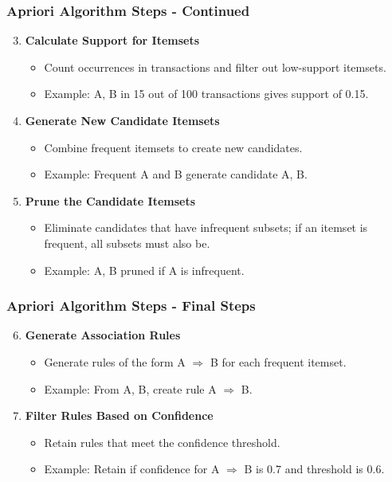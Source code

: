 \documentclass[aspectratio=169]{beamer}
\begin{document}
\begin{frame}[fragile]
    \frametitle{Apriori Algorithm Steps - Continued}
    \begin{enumerate}
        \setcounter{enumi}{2}
        \item \textbf{Calculate Support for Itemsets}
        \begin{itemize}
            \item Count occurrences in transactions and filter out low-support itemsets.
            \item Example: {A, B} in 15 out of 100 transactions gives support of 0.15.
        \end{itemize}

        \item \textbf{Generate New Candidate Itemsets}
        \begin{itemize}
            \item Combine frequent itemsets to create new candidates.
            \item Example: Frequent {A} and {B} generate candidate {A, B}.
        \end{itemize}

        \item \textbf{Prune the Candidate Itemsets}
        \begin{itemize}
            \item Eliminate candidates that have infrequent subsets; if an itemset is frequent, all subsets must also be.
            \item Example: {A, B} pruned if {A} is infrequent.
        \end{itemize}
    \end{enumerate}
\end{frame}

\begin{frame}[fragile]
    \frametitle{Apriori Algorithm Steps - Final Steps}
    \begin{enumerate}
        \setcounter{enumi}{5}
        \item \textbf{Generate Association Rules}
        \begin{itemize}
            \item Generate rules of the form A $\Rightarrow$ B for each frequent itemset.
            \item Example: From {A, B}, create rule {A} $\Rightarrow$ {B}.
        \end{itemize}

        \item \textbf{Filter Rules Based on Confidence}
        \begin{itemize}
            \item Retain rules that meet the confidence threshold.
            \item Example: Retain if confidence for {A} $\Rightarrow$ {B} is 0.7 and threshold is 0.6.
        \end{itemize}
    \end{enumerate}
\end{frame}
\end{document}
